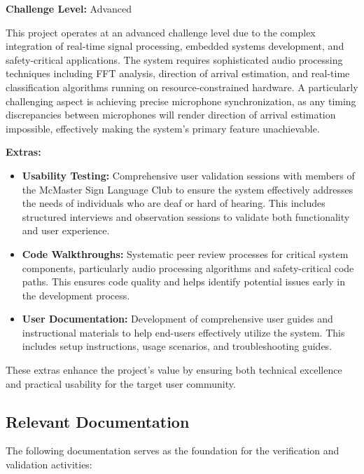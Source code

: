 \documentclass[12pt, titlepage]{article}
\begin{document}
\textbf{Challenge Level:} Advanced

This project operates at an advanced challenge level due to the complex integration of real-time signal processing, embedded systems development, and safety-critical applications. The system requires sophisticated audio processing techniques including FFT analysis, direction of arrival estimation, and real-time classification algorithms running on resource-constrained hardware. 
A particularly challenging aspect is achieving precise microphone synchronization, as any timing discrepancies between microphones will render direction of arrival estimation impossible, effectively making the system's primary feature unachievable.

\textbf{Extras:}
\begin{itemize}
    \item \textbf{Usability Testing:} Comprehensive user validation sessions with members of the McMaster Sign Language Club to ensure the system effectively addresses the needs of individuals who are deaf or hard of hearing. This includes structured interviews and observation sessions to validate both functionality and user experience.
    
    \item \textbf{Code Walkthroughs:} Systematic peer review processes for critical system components, particularly audio processing algorithms and safety-critical code paths. This ensures code quality and helps identify potential issues early in the development process.
    
    \item \textbf{User Documentation:} Development of comprehensive user guides and instructional materials to help end-users effectively utilize the system. This includes setup instructions, usage scenarios, and troubleshooting guides.
\end{itemize}

These extras enhance the project's value by ensuring both technical excellence and practical usability for the target user community.

\subsection{Relevant Documentation}

The following documentation serves as the foundation for the verification and validation activities:
\end{document}
